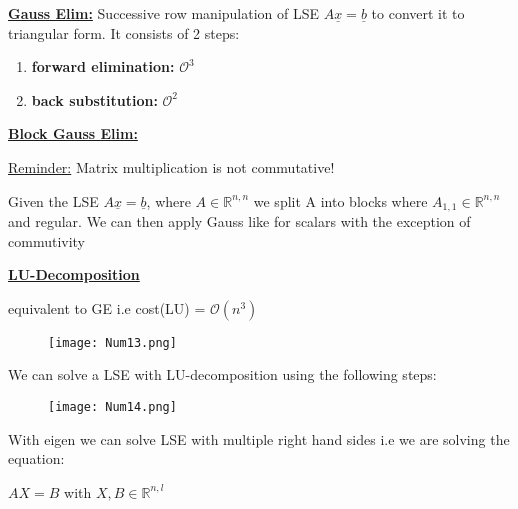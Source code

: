 \documentclass[8pt]{extreport}
\begin{document}
\underline{\textbf{Gauss Elim:}} Successive row manipulation of LSE $A\underline{x} = \underline{b}$ to convert it to triangular form. It consists of 2 steps:
\begin{enumerate}
\item \textbf{forward elimination:} $\mathcal{O}^3$
\item \textbf{back substitution:} $\mathcal{O}^2$
\end{enumerate}  


\underline{\textbf{Block Gauss Elim:}}

\underline{Reminder:} Matrix multiplication is not commutative!

Given the LSE $A\underline{x} = \underline{b}$, where $A \in \mathbb{R}^{n,n}$ we split A into blocks where $A_{1,1} \in \mathbb{R}^{n,n}$ and regular. We can then apply Gauss like for scalars with the exception of commutivity

\underline{\textbf{LU-Decomposition}}

equivalent to GE i.e cost(LU) = $\mathcal{O}(n^3)$

\begin{figure}[H]
\centering
\texttt{[image: Num13.png]}
\end{figure}

We can solve a LSE with LU-decomposition using the following steps:
\begin{figure}[H]
\centering
\texttt{[image: Num14.png]}
\end{figure}

With eigen we can solve LSE with multiple right hand sides i.e we are solving the equation:
\begin{center}
$AX = B$ with $X,B \in \mathbb{R}^{n,l}$
\end{center}
\end{document}
